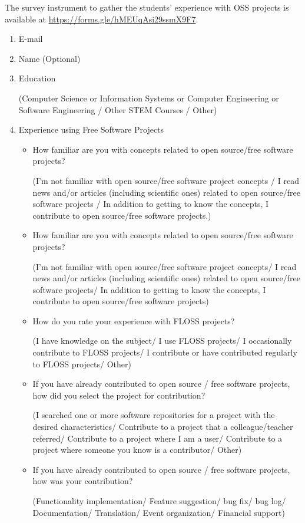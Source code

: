 
The survey instrument to gather the students' experience with OSS projects is available at
\url{https://forms.gle/hMEUqAsi29ssmX9F7}.

\begin{enumerate}
\item E-mail
\item Name (Optional)
\item Education 

(Computer Science or Information Systems or Computer Engineering or Software Engineering /
Other STEM Courses / Other)

\item Experience using Free Software Projects
\begin{itemize}
    \item How familiar are you with concepts related to open source/free software projects?

(I'm not familiar with open source/free software project concepts / I read news and/or articles (including scientific ones) related to open source/free software projects / In addition to getting to know the concepts, I contribute to open source/free software projects.)
    
    \item How familiar are you with concepts related to open source/free software projects?

(I'm not familiar with open source/free software project concepts/
I read news and/or articles (including scientific ones) related to open source/free software projects/
In addition to getting to know the concepts, I contribute to open source/free software projects)
    
\item How do you rate your experience with FLOSS projects?

(I have knowledge on the subject/
I use FLOSS projects/
I occasionally contribute to FLOSS projects/
I contribute or have contributed regularly to FLOSS projects/
Other)

\item If you have already contributed to open source / free software projects, how did you select the project for contribution?

(I searched one or more software repositories for a project with the desired characteristics/
Contribute to a project that a colleague/teacher referred/
Contribute to a project where I am a user/
Contribute to a project where someone you know is a contributor/ Other)

\item If you have already contributed to open source / free software projects, how was your contribution?

(Functionality implementation/
Feature suggestion/
bug fix/
bug log/
Documentation/
Translation/
Event organization/
Financial support)
\end{itemize}

\end{enumerate}

